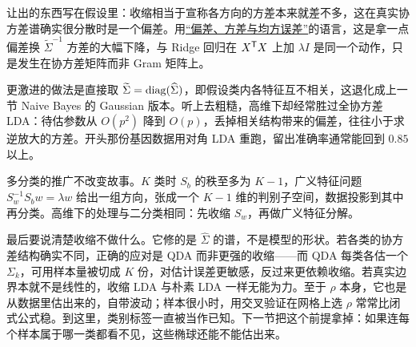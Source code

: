 让出的东西写在假设里：收缩相当于宣称各方向的方差本来就差不多，这在真实协方差谱确实很分散时是一个偏差。用\hyperref[sec:11-Mathematical-Statistics/02-Point-Estimation/01]{``偏差、方差与均方误差''}的语言，这是拿一点偏差换 \(\widetilde\Sigma^{-1}\) 方差的大幅下降，与 Ridge 回归在 \(X^{\mathsf{T}}X\) 上加 \(\lambda I\) 是同一个动作，只是发生在协方差矩阵而非 Gram 矩阵上。

更激进的做法是直接取 \(\widetilde\Sigma=\operatorname{diag}(\widehat\Sigma)\)，即假设类内各特征互不相关，这退化成上一节 Naive Bayes 的 Gaussian 版本。听上去粗糙，高维下却经常胜过全协方差 LDA：待估参数从 \(O(p^2)\) 降到 \(O(p)\)，丢掉相关结构带来的偏差，往往小于求逆放大的方差。开头那份基因数据用对角 LDA 重跑，留出准确率通常能回到 \(0.85\) 以上。

多分类的推广不改变故事。\(K\) 类时 \(S_b\) 的秩至多为 \(K-1\)，广义特征问题 \(S_w^{-1}S_bw=\lambda w\) 给出一组方向，张成一个 \(K-1\) 维的判别子空间，数据投影到其中再分类。高维下的处理与二分类相同：先收缩 \(S_w\)，再做广义特征分解。

最后要说清楚收缩不做什么。它修的是 \(\widehat\Sigma\) 的谱，不是模型的形状。若各类的协方差结构确实不同，正确的应对是 QDA 而非更强的收缩——而 QDA 每类各估一个 \(\Sigma_k\)，可用样本量被切成 \(K\) 份，对估计误差更敏感，反过来更依赖收缩。若真实边界本就不是线性的，收缩 LDA 与朴素 LDA 一样无能为力。至于 \(\rho\) 本身，它也是从数据里估出来的，自带波动；样本很小时，用交叉验证在网格上选 \(\rho\) 常常比闭式公式稳。到这里，类别标签一直被当作已知。下一节把这个前提拿掉：如果连每个样本属于哪一类都看不见，这些椭球还能不能估出来。
